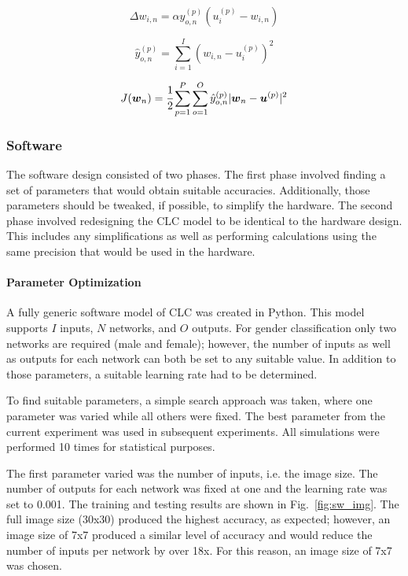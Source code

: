 \documentclass[10pt,journal]{IEEEtran}
\newcommand{\fig}[1]{Fig.~\ref{#1}}
\begin{document}
			\begin{equation}
				\label{sw_weight_update}
				\Delta w_{i,n} = \alpha\hat{y}_{o,n}^{(p)}(u_i^{(p)}-w_{i,n})
			\end{equation}
			
			\begin{equation}
				\label{sw_output}
				\hat{y}_{o,n}^{(p)} = \displaystyle\sum_{i=1}^{I}(w_{i,n} - u_i^{(p)})^2
			\end{equation}
			
			\begin{equation}
				\label{cost_function}
				J(\boldsymbol{w}_n) = \cfrac{1}{2}\displaystyle\sum_{p=1}^{P}\displaystyle\sum_{o=1}^{O}\hat{y}_{o,n}^{(p)}|\boldsymbol{w}_n-\boldsymbol{u}^{(p)}|^2
			\end{equation}
		
		\subsubsection{Software}
			The software design consisted of two phases. The first phase involved finding a set of parameters that would obtain suitable accuracies. Additionally, those parameters should be tweaked, if possible, to simplify the hardware. The second phase involved redesigning the CLC model to be identical to the hardware design. This includes any simplifications as well as performing calculations using the same precision that would be used in the hardware.
			
			\paragraph{Parameter Optimization}
				A fully generic software model of CLC was created in Python. This model supports \(I\) inputs, \(N\) networks, and \(O\) outputs. For gender classification only two networks are required (male and female); however, the number of inputs as well as outputs for each network can both be set to any suitable value. In addition to those parameters, a suitable learning rate had to be determined.
				
				To find suitable parameters, a simple search approach was taken, where one parameter was varied while all others were fixed. The best parameter from the current experiment was used in subsequent experiments. All simulations were performed 10 times for statistical purposes.
				
				The first parameter varied was the number of inputs, i.e. the image size. The number of outputs for each network was fixed at one and the learning rate was set to 0.001. The training and testing results are shown in \fig{fig:sw_img}. The full image size (30x30) produced the highest accuracy, as expected; however, an image size of 7x7 produced a similar level of accuracy and would reduce the number of inputs per network by over 18x. For this reason, an image size of 7x7 was chosen.
				
\end{document}
